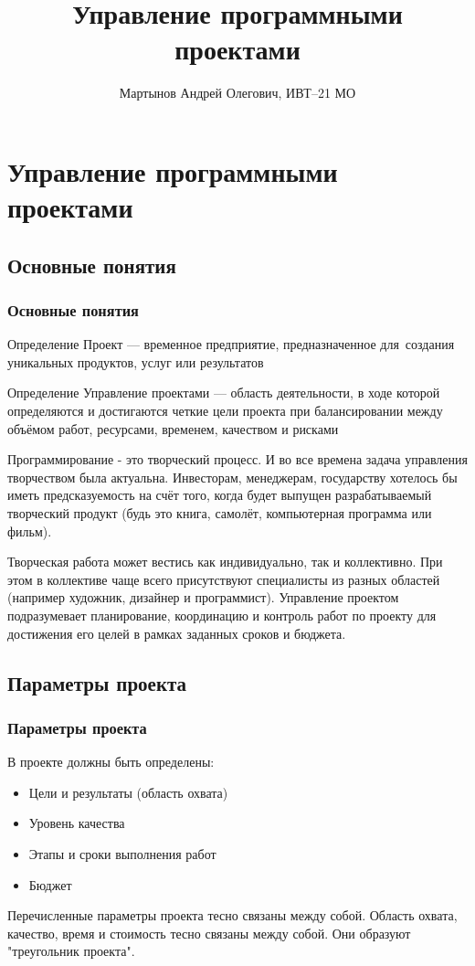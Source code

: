 \documentclass{../industrial-development}
\title{Управление программными проектами}
\author{Мартынов Андрей Олегович, ИВТ--21 МО}
\date{}
\begin{document}
\begin{frame}
  \titlepage
\end{frame}

\section{Управление программными проектами}

\subsection{Основные понятия}

\begin{frame} \frametitle{Основные понятия}
	\begin{block}{Определение}
		\alert{Проект} --- временное предприятие, предназначенное для~создания уникальных продуктов, услуг или результатов
	\end{block}
	\begin{block}{Определение}
		\alert{Управление проектами} --- область деятельности, в ходе которой определяются и достигаются четкие цели проекта при балансировании между объёмом работ, ресурсами, временем, качеством и рисками
	\end{block}
\end{frame}
\lecturenotes
Программирование - это творческий процесс. И во все времена задача управления творчеством была актуальна. Инвесторам, менеджерам, государству хотелось бы иметь предсказуемость на счёт того, когда будет выпущен разрабатываемый творческий продукт (будь это книга, самолёт, компьютерная программа или фильм).

Творческая работа может вестись как индивидуально, так и коллективно. При этом в коллективе чаще всего присутствуют специалисты из разных областей (например художник, дизайнер и программист). Управление проектом подразумевает планирование, координацию и контроль работ по проекту для достижения его целей в рамках заданных сроков и бюджета.

\subsection{Параметры проекта}

\begin{frame} \frametitle{Параметры проекта}
	В проекте должны быть определены:
	\begin{itemize}
		\item Цели и результаты (область охвата)
		\item Уровень качества
		\item Этапы и сроки выполнения работ
		\item Бюджет
	\end{itemize}
\end{frame}
\lecturenotes
Перечисленные параметры проекта тесно связаны между собой. Область охвата, качество, время и стоимость тесно связаны между собой. Они образуют "треугольник проекта".
\end{document}
